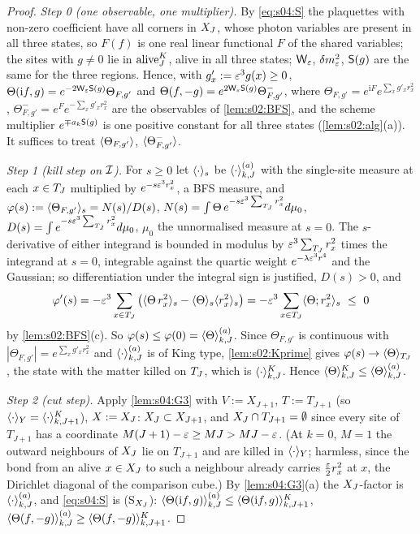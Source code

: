 \begin{proof}
\emph{Step 0 (one observable, one multiplier).} By \eqref{eq:s04:S} the plaquettes with non-zero coefficient have all corners in $X_J$, whose photon variables are present in all three states, so $F(f)$ is one real linear functional $F$ of the shared variables; the sites with $g\ne0$ lie in $\operatorname{alive}^K_J$, alive in all three states; $\mathsf W_{\varepsilon}$, $\delta m^2_{\varepsilon}$, $\mathsf S(g)$ are the same for the three regions. Hence, with $g'_x:=\varepsilon^3g(x)\ge0$, $\Theta(\mathrm if,g)=e^{-2\mathsf W_{\varepsilon}\mathsf S(g)}\Theta_{F,g'}$ and $\Theta(f,-g)=e^{2\mathsf W_{\varepsilon}\mathsf S(g)}\Theta^-_{F,g'}$, where $\Theta_{F,g'}=e^{\mathrm iF}e^{\sum_xg'_xr_x^2}$, $\Theta^-_{F,g'}=e^{F}e^{-\sum_xg'_xr_x^2}$ are the observables of \cref{lem:s02:BFS}, and the scheme multiplier $e^{\mp a_k\mathsf S(g)}$ is one positive constant for all three states (\cref{lem:s02:alg}(a)). It suffices to treat $\langle \Theta_{F,g'}\rangle$, $\langle \Theta^-_{F,g'}\rangle$.

\emph{Step 1 (kill step on $\mathcal I$).} For $s\ge0$ let $\langle \cdot\rangle_s$ be $\langle \cdot\rangle^{(a)}_{k,J}$ with the single-site measure at each $x\in T_J$ multiplied by $e^{-s\varepsilon^3r_x^2}$, a BFS measure, and $\varphi(s):=\langle \Theta_{F,g'}\rangle_s=N(s)/D(s)$, $N(s)=\int\Theta\,e^{-s\varepsilon^3\sum_{T_J}r_x^2}d\mu_0$, $D(s)=\int e^{-s\varepsilon^3\sum_{T_J}r_x^2}d\mu_0$, $\mu_0$ the unnormalised measure at $s=0$. The $s$-derivative of either integrand is bounded in modulus by $\varepsilon^3\sum_{T_J}r_x^2$ times the integrand at $s=0$, integrable against the quartic weight $e^{-\lambda\varepsilon^3r^4}$ and the Gaussian; so differentiation under the integral sign is justified, $D(s)>0$, and
\[
\varphi'(s)=-\eps^3\sum_{x\in\TJ}\big(\av{\Theta\,r_x^2}_s-\av{\Theta}_s\av{r_x^2}_s\big)=-\eps^3\sum_{x\in\TJ}\av{\Theta;r_x^2}_s\ \le\ 0
\]
by \cref{lem:s02:BFS}(c). So $\varphi(s)\le\varphi(0)=\langle \Theta\rangle^{(a)}_{k,J}$. Since $\Theta_{F,g'}$ is continuous with $|\Theta_{F,g'}|=e^{\sum_xg'_xr_x^2}$ and $\langle \cdot\rangle^{(a)}_{k,J}$ is of King type, \cref{lem:s02:Kprime} gives $\varphi(s)\to\langle \Theta\rangle_{T_J}$, the state with the matter killed on $T_J$, which is $\langle \cdot\rangle^{K}_{k,J}$. Hence $\langle \Theta\rangle^{K}_{k,J}\le\langle \Theta\rangle^{(a)}_{k,J}$.

\emph{Step 2 (cut step).} Apply \cref{lem:s04:G3} with $V:=X_{J+1}$, $T:=T_{J+1}$ (so $\langle \cdot\rangle_Y=\langle\cdot\rangle^K_{k,J+1}$), $X:=X_J$: $X_J\subset X_{J+1}$, and $X_J\cap T_{J+1}=\emptyset$ since every site of $T_{J+1}$ has a coordinate $M(J+1)-\varepsilon\ge MJ>MJ-\varepsilon$. (At $k=0$, $M=1$ the outward neighbours of $X_J$ lie on $T_{J+1}$ and are killed in $\langle \cdot\rangle_Y$; harmless, since the bond from an alive $x\in X_J$ to such a neighbour already carries $\frac{\varepsilon}2r_x^2$ at $x$, the Dirichlet diagonal of the comparison cube.) By \cref{lem:s04:G3}(a) the $X_J$-factor is $\langle \cdot\rangle^{(a)}_{k,J}$, and \eqref{eq:s04:S} is (S$_{X_J}$): $\langle \Theta(\mathrm if,g)\rangle^{(a)}_{k,J}\le\langle\Theta(\mathrm if,g)\rangle^K_{k,J+1}$, $\langle \Theta(f,-g)\rangle^{(a)}_{k,J}\ge\langle\Theta(f,-g)\rangle^K_{k,J+1}$.


\end{proof}
